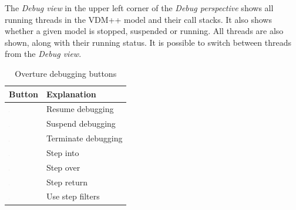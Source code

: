 The \emph{Debug view} in the upper left corner of the \emph{Debug
  perspective} shows all running threads in the VDM++ model and their
call stacks. It also shows whether a given model is stopped, suspended
or running. All threads are also shown, along with their running
status. It is possible to switch between threads from the \emph{Debug view}.

\begin{table}
\begin{center}
\begin{tabular}{|l|l|}\hline \hline
\textbf{Button} & \textbf{Explanation} \\ \hline
\includegraphics[width=0.03\textwidth]{figures/resume} & Resume debugging \\
\includegraphics[width=0.03\textwidth]{figures/suspend} & Suspend debugging\\
\includegraphics[width=0.03\textwidth]{figures/terminate} & Terminate debugging\\
\includegraphics[width=0.03\textwidth]{figures/stepinto} & Step into\\
\includegraphics[width=0.03\textwidth]{figures/stepover} & Step over \\
\includegraphics[width=0.03\textwidth]{figures/stepreturn} & Step return\\
\includegraphics[width=0.03\textwidth]{figures/stepbystep} & Use step filters\\
\hline \hline
\end{tabular}
\caption{Overture debugging buttons\label{tab:debugButtons}}
\end{center}
\end{table}


